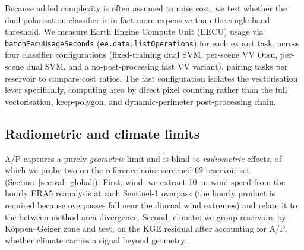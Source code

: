 Because added complexity is often assumed to raise cost, we test whether
the dual-polarisation classifier is in fact more expensive than the
single-band threshold. We measure Earth Engine Compute Unit (EECU) usage
via \texttt{batchEecuUsageSeconds} (\texttt{ee.data.listOperations}) for
each export task, across four classifier configurations (fixed-training
dual SVM, per-scene VV Otsu, per-scene dual SVM, and a no-post-processing
fast VV variant), pairing tasks per reservoir to compare cost ratios. The
fast configuration isolates the vectorisation lever specifically,
computing area by direct pixel counting rather than the full
vectorisation, keep-polygon, and dynamic-perimeter post-processing chain.

\subsection{Radiometric and climate limits}
\label{sec:methods_wind}

A/P captures a purely \emph{geometric} limit and is blind to
\emph{radiometric} effects, of which we probe two on the reference-noise-screened
62-reservoir set (Section~\ref{sec:val_global}). First, wind: we extract 10~m
wind speed from the hourly ERA5 reanalysis \citep{Hersbach2020} at each
Sentinel-1 overpass (the hourly product is required because overpasses fall near
the diurnal wind extremes) and relate it to the between-method area divergence.
Second, climate: we group reservoirs by K\"oppen--Geiger zone and test, on the
KGE residual after accounting for A/P, whether climate carries a signal beyond
geometry.
